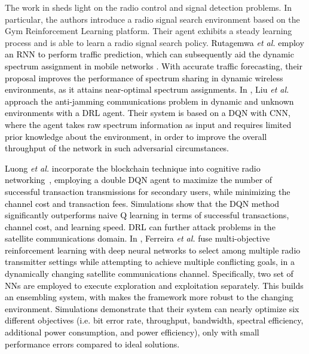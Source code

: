 \documentclass[journal,comsoc,letter]{IEEEtran}
\newcommand{\edit}[1]{\textcolor{black}{#1}}
\newcommand{\rev}[1]{\textcolor{black}{#1}}
\begin{document}
The work in \cite{o2016deep} sheds light on the radio control and signal detection problems. In particular, the authors introduce a radio signal search environment based on the Gym Reinforcement Learning platform. Their agent exhibits a steady learning process and is able to learn a radio signal search policy. \edit{Rutagemwa \emph{et al.} employ an RNN to perform traffic prediction, which can subsequently aid the dynamic spectrum assignment in mobile networks \cite{rutagemwa2018dynamic}. With accurate traffic forecasting, their proposal  improves the performance of spectrum sharing in dynamic wireless environments, as it attains near-optimal spectrum assignments.} \rev{In \cite{liu2018anti}, Liu \emph{et al.} approach the anti-jamming communications problem in dynamic and unknown environments with a DRL agent. Their system is based on a DQN with CNN, where the agent takes raw spectrum information as input and requires limited prior knowledge about the environment, in order to improve the overall throughput of the network in such adversarial circumstances.} 

\rev{Luong \emph{et al.} incorporate the blockchain technique into cognitive radio networking~\cite{luong2018joint}, employing a double DQN agent to maximize the number of successful transaction transmissions for secondary users, while minimizing the channel cost and transaction fees. Simulations show that the DQN method significantly outperforms na\:ive Q learning in terms of successful transactions, channel cost, and learning speed. DRL can further attack problems in the satellite communications domain. In \cite{ferreira2018multi}, Ferreira \emph{et al.} fuse multi-objective reinforcement learning \cite{ferreira2016multi} with deep neural networks to select among multiple radio transmitter settings while attempting to achieve multiple conflicting goals, in a dynamically changing satellite communications channel. Specifically, two set of NNs are employed to execute exploration and exploitation separately. This builds an ensembling system, with makes the framework more robust to the changing environment. Simulations demonstrate that their system can nearly optimize six different objectives (i.e. bit error rate, throughput, bandwidth, spectral efficiency, additional power consumption, and power efficiency), only with small performance errors compared to ideal solutions.}\\
\end{document}
